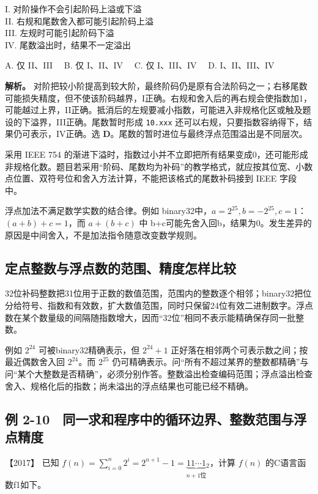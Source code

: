 I. 对阶操作不会引起阶码上溢或下溢\\
II. 右规和尾数舍入都可能引起阶码上溢\\
III. 左规时可能引起阶码下溢\\
IV. 尾数溢出时，结果不一定溢出

A. 仅 II、III　 B. 仅 I、II、IV　 C. 仅 I、III、IV　 D. I、II、III、IV


\textbf{解析。} 对阶把较小阶提高到较大阶，最终阶码仍是原有合法阶码之一；右移尾数可能损失精度，但不使该阶码越界，I正确。右规和舍入后的再右规会使指数加1，可能越过上界，II正确。抵消后的左规要减小指数，可能进入非规格化区或触及题设的下溢界，III正确。尾数暂时形成 \texttt{10.xxx} 还可以右规，只要指数容纳得下，结果仍可表示，IV正确。选 \textbf{D}。尾数的暂时进位与最终浮点范围溢出是不同层次。

采用 IEEE 754 的渐进下溢时，指数过小并不立即把所有结果变成0，还可能形成非规格化数。题目若采用``阶码、尾数均为补码''的教学格式，就应按其位宽、小数点位置、双符号位和舍入方法计算，不能把该格式的尾数补码接到 IEEE 字段中。

浮点加法不满足数学实数的结合律。例如 binary32中，\(a=2^{25},b=-2^{25},c=1\)：\((a+b)+c=1\)，而 \(a+(b+c)\) 中 b+c可能先舍入回b，结果为0。发生差异的原因是中间舍入，不是加法指令随意改变数学规则。

\subsection{定点整数与浮点数的范围、精度怎样比较}\label{co-c02-h270}

32位补码整数把31位用于正数的数值范围，范围内的整数逐个相邻；binary32把位分给符号、指数和有效数，扩大数值范围，同时只保留24位有效二进制数字。浮点数在某个数量级的间隔随指数增大，因而``32位''相同不表示能精确保存同一批整数。

例如 \(2^{24}\) 可被binary32精确表示，但 \(2^{24}+1\) 正好落在相邻两个可表示数之间；按最近偶数舍入回 \(2^{24}\)。而 \(2^{25}\) 仍可精确表示。问``所有不超过某界的整数都精确''与问``某个大整数是否精确''，必须分别作答。整数溢出检查编码范围；浮点溢出检查舍入、规格化后的指数；尚未溢出的浮点结果也可能已经不精确。

\subsection{例 2-10　同一求和程序中的循环边界、整数范围与浮点精度}\label{co-ex2-10}

\noindent{}【2017】 已知 \(f(n)=\sum_{i=0}^{n}2^i=2^{n+1}-1=\underbrace{11\cdots1}_{n+1\text{位}}{}_2\)，计算 \(f(n)\) 的C语言函数f1如下。

